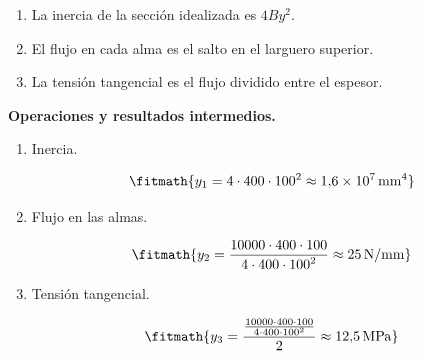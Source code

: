 \begin{enumerate}

\item La inercia de la sección idealizada es $4 B y^2$.

\item El flujo en cada alma es el salto en el larguero superior.

\item La tensión tangencial es el flujo dividido entre el espesor.

\end{enumerate}

\noindent\textbf{Operaciones y resultados intermedios.}

\begin{enumerate}

\item Inercia.

\[\fitmath{y_{1}=4\cdot 400\cdot {100}^{2}\approx 1{,}6\times10^{7}\,\mathrm{mm^{4}}}\]

\item Flujo en las almas.

\[\fitmath{y_{2}=\frac{10000\cdot 400\cdot 100}{4\cdot 400\cdot {100}^{2}}\approx 25\,\mathrm{N/mm}}\]

\item Tensión tangencial.

\[\fitmath{y_{3}=\frac{\frac{10000\cdot 400\cdot 100}{4\cdot 400\cdot {100}^{2}}}{2}\approx 12{,}5\,\mathrm{MPa}}\]

\end{enumerate}
